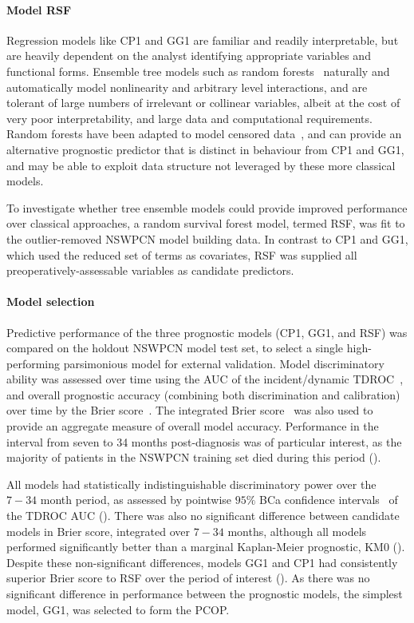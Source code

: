 \documentclass[dissertation.tex]{subfiles}
\begin{document}
\paragraph{Model RSF}
Regression models like CP1 and GG1 are familiar and readily interpretable, but are heavily dependent on the analyst identifying appropriate variables and functional forms.  Ensemble tree models such as random forests~\cite{Breiman2001} naturally and automatically model nonlinearity and arbitrary level interactions, and are tolerant of large numbers of irrelevant or collinear variables, albeit at the cost of very poor interpretability, and large data and computational requirements.  Random forests have been adapted to model censored data~\cite{Ishwaran2008}, and can provide an alternative prognostic predictor that is distinct in behaviour from CP1 and GG1, and may be able to exploit data structure not leveraged by these more classical models.

To investigate whether tree ensemble models could provide improved performance over classical approaches, a random survival forest model, termed RSF, was fit to the outlier-removed \gls{NSWPCN} model building data.  In contrast to CP1 and GG1, which used the reduced set of terms as covariates, RSF was supplied all preoperatively-assessable variables as candidate predictors.

\paragraph{Model selection}
Predictive performance of the three prognostic models (CP1, GG1, and RSF) was compared on the holdout \gls{NSWPCN} model test set, to select a single high-performing parsimonious model for external validation.  Model discriminatory ability was assessed over time using the \gls{AUC} of the incident/dynamic \gls{TDROC}~\cite{Heagerty2005}, and overall prognostic accuracy (combining both discrimination and calibration) over time by the Brier score~\cite{Graf1999}.  The integrated Brier score~\cite{Graf1999} was also used to provide an aggregate measure of overall model accuracy.  Performance in the interval from seven to 34 months post-diagnosis was of particular interest, as the majority of patients in the \gls{NSWPCN} training set died during this period ().

All models had statistically indistinguishable discriminatory power over the $7-34$ month period, as assessed by pointwise $95\%$ BCa confidence intervals~\cite{Efron1987} of the \gls{TDROC} \gls{AUC} ().  There was also no significant difference between candidate models in Brier score, integrated over $7-34$ months, although all models performed significantly better than a marginal Kaplan-Meier prognostic, KM0 ().  Despite these non-significant differences, models GG1 and CP1 had consistently superior Brier score to RSF over the period of interest ().  As there was no significant difference in performance between the prognostic models, the simplest model, GG1, was selected to form the \gls{PCOP}.
\end{document}
